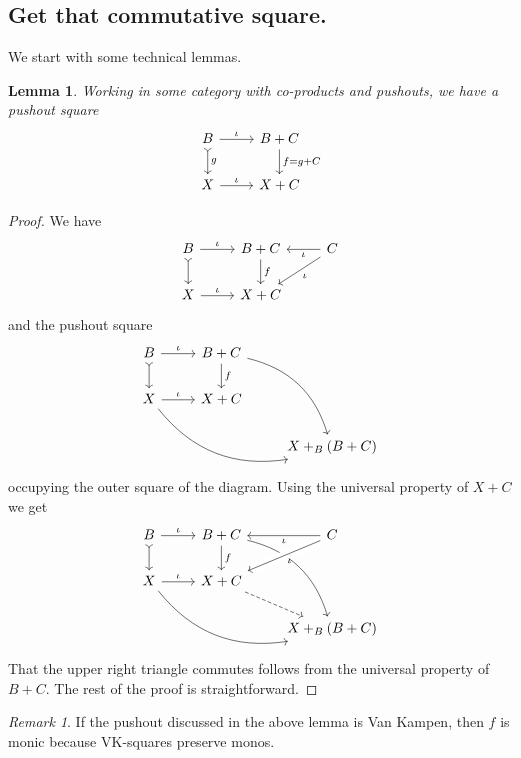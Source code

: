 \documentclass[12pt]{article}
\renewcommand{\(}{\left(}
\renewcommand{\)}{\right)}
\renewcommand{\{}{\left\lbrace}
\renewcommand{\}}{\right\rbrace}
\newtheorem*{lem}{Lemma}
\theoremstyle{remark}
\newtheorem*{remark}{Remark}
\theoremstyle{definition}
\begin{document}
 \subsection*{Get that commutative square.}
 
 We start with some technical lemmas.
 
 \begin{lem}
 	Working in some category with co-products and pushouts, we have a pushout square
 	\[
 	\begin{tikzcd}
 	{B} \ar[r,"\iota"] \ar[d,rightarrowtail,"g"] &
 	{B+C} \ar[d,"f=g+C"] \\
 	{X} \ar[r, "\iota"]&
 	{X+C}
 	\end{tikzcd}
 	\]
 \end{lem}
 \begin{proof}
 	We have 
 	\[
 	\begin{tikzcd}
 	{B} \ar[r,"\iota"] \ar[d,rightarrowtail] &
 	{B+C} \ar[d,"f"] &
 	{C} \ar[l,"\iota"] \ar[dl,"\iota"]\\
 	{X} \ar[r, "\iota"]&
 	{X+C}
 	\end{tikzcd}
 	\]
 	and the pushout square
 	\[
 	\begin{tikzcd}
 	{B} \ar[r,"\iota"] \ar[d,rightarrowtail] &
 	{B+C} \ar[d,"f"] \ar[ddr,bend left]&
 	{} \\
 	{X} \ar[r, "\iota"] \ar[rrd,bend right] &
 	{X+C} &
 	{} \\
 	{} &
 	{} &
 	{X+_B(B+C)}
 	\end{tikzcd}
 	\]
 	occupying the outer square of the diagram. 
 	Using the universal property of $X+C$ we get
 	\[
 	\begin{tikzcd}
 	{B} \ar[r,"\iota"] \ar[d,rightarrowtail] &
 	{B+C} \ar[d,"f"] \ar[ddr,bend left]&
 	{C} \ar[l,"\iota"] \ar[dl,"\iota",crossing over]  \\
 	{X} \ar[r, "\iota"] \ar[rrd,bend right] &
 	{X+C} \ar[dr,dashed]&
 	{}\\
 	{} &
 	{} &
 	{X+_B(B+C)}
 	\end{tikzcd}
 	\]
 	That the upper right triangle commutes follows from the universal property of $B+C$.  
 	The rest of the proof is straightforward. 
 \end{proof}
 
 \begin{remark}
 	If the pushout discussed in the above lemma is Van Kampen, then $f$ is monic because 
 	VK-squares preserve monos.
 \end{remark}
 
\end{document}
